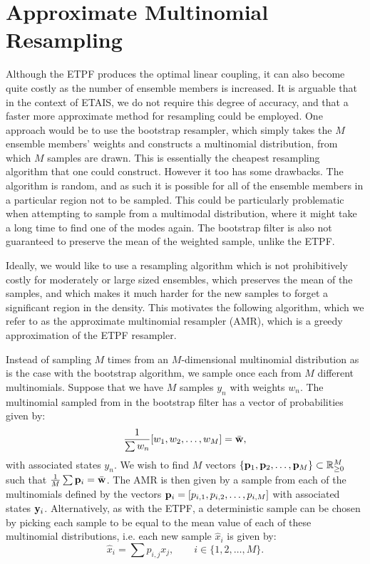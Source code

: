 \documentclass[final]{siamltex}
\begin{document}
\section{Approximate Multinomial Resampling}\label{sec:AMR}

Although the ETPF produces the optimal linear coupling, it can also become quite costly as the number of ensemble members
is increased. It is arguable that in the context of ETAIS, we do not
require this degree of accuracy, and that a faster more approximate
method for resampling could be employed. One approach would be to use
the bootstrap resampler, which simply takes the $M$ ensemble members'
weights and constructs a multinomial distribution, from which $M$
samples are drawn. This is essentially the cheapest resampling
algorithm that one could construct. However it too has some
drawbacks. The algorithm is random, and as such it is possible for all
of the ensemble members in a particular region not to be sampled. This
could be particularly problematic when attempting to sample from a
multimodal distribution, where it might take a long time to find one
of the modes again. The bootstrap filter is also not guaranteed to
preserve the mean of the weighted sample, unlike the ETPF.

Ideally, we would like to use a resampling algorithm which is not
prohibitively costly for moderately or large sized ensembles,
which preserves the mean of the samples, and which makes it much
harder for the new samples to forget a significant region in the
density. This motivates the following algorithm, which we refer to as the
approximate multinomial resampler (AMR), which is a greedy
approximation of the ETPF resampler.

Instead of sampling $M$ times from an $M$-dimensional multinomial
distribution as is the case with the bootstrap algorithm, we sample
once each from $M$ different multinomials. Suppose that we have $M$
samples $y_n$ with weights $w_n$. The multinomial sampled from in the
bootstrap filter has a vector of probabilities given by:
\begin{equation*}
\frac{1}{\sum w_n} [w_1,w_2,\ldots,w_M] = \bar{\bf w},
\end{equation*}
with associated states $y_n$.
We wish to find $M$ vectors $\{{\bf p}_1,{\bf p}_2,\ldots,{\bf p}_M\}
\subset \mathbb{R}^M_{\ge 0}$
such that  $\frac{1}{M} \sum {\bf p}_i = \bar{\bf w}$. The AMR is then
given by a sample from each of the multinomials defined by the vectors
${\bf p}_i = [p_{i,1},p_{i,2},\ldots,p_{i,M}]$ with associated states ${\bf y}_i$. Alternatively, as with the ETPF, a deterministic sample
can be chosen by picking each sample to be equal to the mean value of
each of these multinomial distributions, i.e. each new sample
$\hat{x}_i$ is given by:
\begin{equation}
\hat{x}_i = \sum p_{i,j} x_j, \qquad i \in \{1,2,\ldots,M\}.
\end{equation}
\end{document}

